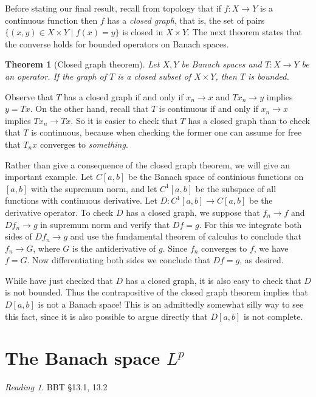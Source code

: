 \documentclass[11pt,oneside]{amsbook}
\theoremstyle{definition}
\theoremstyle{plain}
\newtheorem{thm}{Theorem}[section]
\theoremstyle{definition}
\theoremstyle{remark}
\newtheorem*{reading}{Reading}
\numberwithin{equation}{section}
\numberwithin{figure}{section}
\begin{document}
Before stating our final result, recall from topology that if $f\colon X\to Y$ is a continuous function then $f$ has a \emph{closed graph}, that is, the set of pairs $\{(x,y)\in X\times Y\mid f(x)=y\}$ is closed in $X\times Y$. The next theorem states that the converse holds for bounded operators on Banach spaces.

\begin{thm}[Closed graph theorem]
  Let $X,Y$ be Banach spaces and $T\colon X\to Y$ be an operator. If the graph of $T$ is a closed subset of $X\times Y$, then $T$ is bounded.
\end{thm}

Observe that $T$ has a closed graph if and only if $x_n\to x$ and $Tx_n\to y$ implies $y=Tx$. On the other hand, recall that $T$ is continuous if and only if $x_n\to x$ implies $Tx_n\to Tx$.  So it is easier to check that $T$ has a closed graph than to check that $T$ is continuous, because when checking the former one can assume for free that $T_nx$ converges to \emph{something}.

Rather than give a consequence of the closed graph theorem, we will give an important example. Let $C[a,b]$ be the Banach space of continious functions on $[a,b]$ with the supremum norm, and let $C^1[a,b]$ be the subspace of all functions with continuous derivative. Let $D\colon C^1[a,b]\to C[a,b]$ be the derivative operator. To check $D$ has a closed graph, we suppose that $f_n\to f$ and $Df_n\to g$ in supremum norm and verify that $Df=g$. For this we integrate both sides of $Df_n\to g$ and use the fundamental theorem of calculus to conclude that $f_n\to G$, where $G$ is the antiderivative of $g$. Since $f_n$ converges to $f$, we have $f=G$. Now differentiating both sides we conclude that $Df=g$, as desired.

While have just checked that $D$ has a closed graph, it is also easy to check that $D$ is not bounded. Thus the contrapositive of the closed graph theorem implies that $D[a,b]$ is not a Banach space! This is an admittedly somewhat silly way to see this fact, since it is also possible to argue directly that $D[a,b]$ is not complete.

\newpage
\section{The Banach space $L^p$}

\begin{reading}
  BBT \S 13.1, 13.2
\end{reading}
\end{document}
